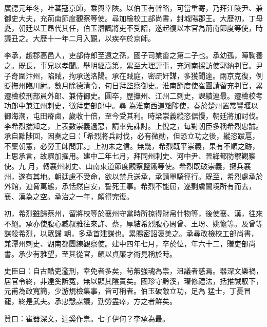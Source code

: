 \begin{pinyinscope}
 廣德元年冬，吐蕃寇京師，乘輿幸陜。以伯玉有幹略，可當重寄，乃拜江陵尹、兼御史大夫，充荊南節度觀察等使。尋加檢校工部尚書，封城陽郡王。大歷初，丁母憂，朝廷以王昂代其任，伯玉潛諷將吏不受詔，遂起復以本官為荊南節度等使，時議丑之。大歷十一年二月入覲，以疾卒於京師。



 李承，趙郡高邑人，吏部侍郎至遠之孫，國子司業畬之第二子也。承幼孤，曄鞠養之。既長，事兄以孝聞。舉明經高第，累至大理評事，充河南採訪使郭納判官。尹子奇圍汴州，陷賊，拘承送洛陽。承在賊庭，密疏奸謀，多獲聞達。兩京克復，例貶撫州臨川尉。數月除德清令，旬日拜監察御史。淮南節度使崔圓請留充判官，累遷檢校刑部員外郎、兼侍御史。圓卒，歷撫州、江州二刺史，課績連最。遷檢校考功郎中兼江州刺史，徵拜吏部郎中。尋
 為淮南西道黜陟使，奏於楚州置常豐堰以御海潮，屯田瘠鹵，歲收十倍，至今受其利。時梁崇義縱恣倨慢，朝廷將加討伐。李希烈揣知之，上表數崇義過惡，請率先誅討。上悅之，每對朝臣多稱希烈忠誠。承自黜陟回，因奏之曰：「希烈將兵討伐，必有微勛，但恐立功之後，縱恣跋扈，不稟朝憲，必勞王師問罪。」上初未之信。無幾，希烈既平崇義，果有不順之跡，上思承言，故驟加擢用。建中二年七月，拜同州刺史、河中尹、晉絳都防禦觀察使。九
 月，轉襄州刺史、山南東道節度觀察鹽鐵等使。希烈既破崇義，擁兵襄州，遂有其地。朝廷慮不受命，欲以禁兵送承，承請單騎徑行。既至，希烈處承於外館，迫脅萬態，承恬然自安，誓死王事。希烈不能屈，遂剽虜闔境所有而去，襄、漢為之空。承治之一年，頗得完復。



 初，希烈雖歸蔡州，留將校等於襄州守當時所掠得財帛什物等，後使襄、漢，往來不絕。承亦使腹心臧叔雅往來許、蔡，厚結希烈腹心周曾、王玢、姚憺等。及曾等謀殺希烈，以眾歸
 朝，多承首建謀也。累賜密詔褒美之。承尋改檢校工部尚書，兼潭州刺史、湖南都團練觀察使。建中四年七月，卒於位，年六十二，贈吏部尚書。承少有雅望，至其從官，頗以貞廉才術見稱於時。



 史臣曰：自古酷吏濫刑，幸免者多矣，茍無強魂為祟，沮議者惑焉。器深文樂禍，居官令終，非達奚訴冤，無以顯其陰責矣。國珍守黔溪，瓘修禮法，括推誠馭下，元甫為政寬簡，少游規檢集事，皆可稱者。伯玉破敵立功，足為
 猛士，丁憂冒寵，終是武夫。承忠愨謀議，勤勞盡瘁，方之者鮮矣。



 贊曰：崔器深文，達奚作祟。七子伊何？李承為最。



\end{pinyinscope}